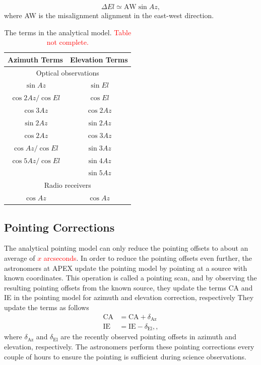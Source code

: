 \begin{equation}
    \Delta El \simeq \text{AW} \sin{Az},
\end{equation}
where AW is the misalignment alignment in the east-west direction.

\begin{table}[h]
    \centering
    \caption{The terms in the analytical model. \textcolor{red}{Table not complete.} }
    \begin{tabular}{cc}
    \textbf{Azimuth Terms} & \textbf{Elevation Terms} \\
    \hline
    \multicolumn{2}{c}{Optical observations} \\ 
    \cline{1-2}
    \hline
    $\sin{Az}$ & $\sin{El}$ \\
    $\cos{2Az}/\cos{El}$ & $\cos{El}$ \\
    $\cos{3Az}$ & $\cos{2Az}$ \\
    $\sin{2Az}$ & $\sin{2Az}$ \\
    $\cos{2Az}$     & $\cos{3Az}$ \\
    $\cos{Az}/\cos{El}$ & $\sin{3Az}$ \\
    $\cos{5Az}/\cos{El}$ & $\sin{4Az}$ \\
    & $\sin{5Az}$ \\
    \multicolumn{2}{c}{Radio receivers} \\
    \cline{1-2}
    \hline
    $\cos{Az}$ & $\cos{Az}$ \\
    \end{tabular}
\end{table}

\subsection{Pointing Corrections} 
The analytical pointing model can only reduce the pointing offsets to about an average of \textcolor{red}{$x$ arcseconds}.
In order to reduce the pointing offsets even further, the astronomers at APEX update the pointing model by pointing at a source with known coordinates.
This operation is called a pointing scan, and by observing the resulting pointing offsets from the known source,
they update the terms CA and IE in the pointing model for azimuth and elevation correction, respectively
They update the terms as follows
\begin{align}
    \text{CA} &= \text{CA} + \delta_{\text{Az}} \label{eq:ca}\\ 
    \text{IE} &= \text{IE} - \delta_{\text{El}},\label{eq:ie},
\end{align}
where $\delta_{\text{Az}}$ and $\delta_{\text{El}}$ are the recently observed pointing offsets in azimuth and elevation, respectively.
The astronomers perform these pointing corrections every couple of hours to ensure the pointing is sufficient during science observations.

